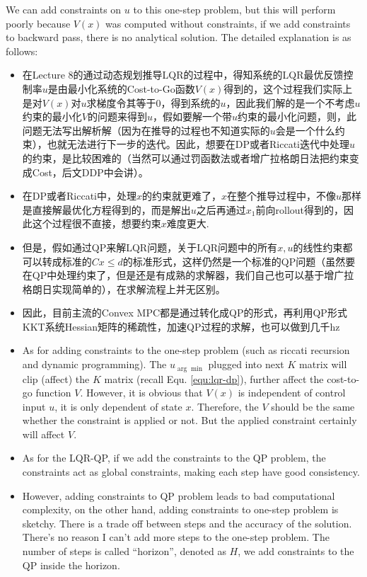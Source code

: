 We can add constraints on $u$ to this one-step problem, but this will perform poorly because $V(x)$ was computed without constraints, if we add constraints to backward pass, there is no analytical solution. The detailed explanation is as follows:

\begin{itemize}
    \item 在Lecture 8的通过动态规划推导LQR的过程中，得知系统的LQR最优反馈控制率$u$是由最小化系统的Cost-to-Go函数$V(x)$得到的，这个过程我们实际上是对$V(x)$对$u$求梯度令其等于0，得到系统的$u$，因此我们解的是一个不考虑$u$约束的最小化$V$的问题来得到$u$，假如要解一个带$u$约束的最小化问题，则，此问题无法写出解析解（因为在推导的过程也不知道实际的$u$会是一个什么约束），也就无法进行下一步的迭代。因此，想要在DP或者Riccati迭代中处理$u$的约束，是比较困难的（当然可以通过罚函数法或者增广拉格朗日法把约束变成Cost，后文DDP中会讲）。
    \item 在DP或者Riccati中，处理$x$的约束就更难了，$x$在整个推导过程中，不像$u$那样是直接解最优化方程得到的，而是解出$u$之后再通过$x_1$前向rollout得到的，因此这个过程很不直接，想要约束$x$难度更大.
    \item 但是，假如通过QP来解LQR问题，关于LQR问题中的所有$x,u$的线性约束都可以转成标准的$Cx\le d$的标准形式，这样仍然是一个标准的QP问题（虽然要在QP中处理约束了，但是还是有成熟的求解器，我们自己也可以基于增广拉格朗日实现简单的），在求解流程上并无区别。
    \item 因此，目前主流的Convex MPC都是通过转化成QP的形式，再利用QP形式KKT系统Hessian矩阵的稀疏性，加速QP过程的求解，也可以做到几千hz
    \item As for adding constraints to the one-step problem (such as riccati recursion and dynamic programming). The $u_{\arg\min}$ plugged into next $K$ matrix will clip (affect) the $K$ matrix (recall Equ. \eqref{equ:lqr-dp}), further affect the cost-to-go function $V$. However, it is obvious that $V(x)$ is independent of control input $u$, it is only dependent of state $x$. Therefore, the $V$ should be the same whether the constraint is applied or not. But the applied constraint certainly will affect $V$.
    \item  As for the LQR-QP, if we add the constraints to the QP problem, the constraints act as global constraints, making each step have good consistency.
    \item However, adding constraints to QP problem leads to bad computational complexity, on the other hand, adding constraints to one-step problem is sketchy. There is a trade off between steps and the accuracy of the solution. There's no reason I can't add more steps to the one-step problem. The number of steps is called ``horizon'', denoted as $H$, we add constraints to the QP inside the horizon.
\end{itemize}

